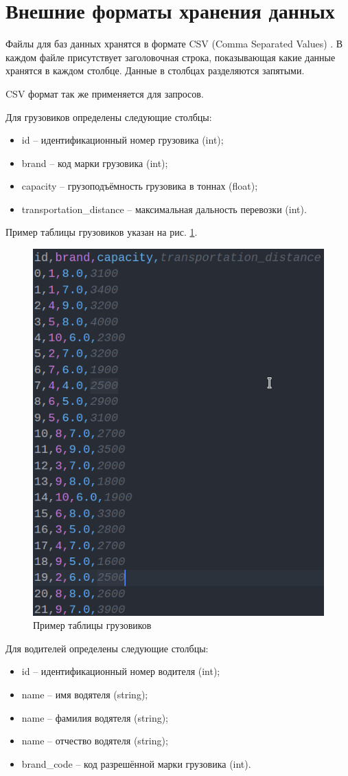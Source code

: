 \section{Внешние форматы хранения данных}

Файлы для баз данных хранятся в формате CSV (Comma Separated Values) \cite{csv}. В каждом файле присутствует заголовочная строка, показывающая какие данные хранятся в каждом столбце. Данные в столбцах разделяются запятыми.

CSV формат так же применяется для запросов.

Для грузовиков определены следующие столбцы:
\begin{itemize}
	\item id -- идентификационный номер грузовика (int);
	\item brand -- код марки грузовика (int);
	\item capacity -- грузоподъёмность грузовика в тоннах (float);
	\item transportation\_distance -- максимальная дальность перевозки (int).
\end{itemize}

Пример таблицы грузовиков указан на рис. \ref{truck_table}.

\begin{figure}[hpt!]
	\centering
	\includegraphics[width=0.5\linewidth]{photo/truck_table}
	\caption{Пример таблицы грузовиков}
	\label{truck_table}
\end{figure}

\newpage
Для водителей определены следующие столбцы:
\begin{itemize}
	\item id -- идентификационный номер водителя (int);
	\item name -- имя водятеля (string);
	\item name -- фамилия водятеля (string);
	\item name -- отчество водятеля (string);
	\item brand\_code -- код разрешённой марки грузовика (int).
\end{itemize}

